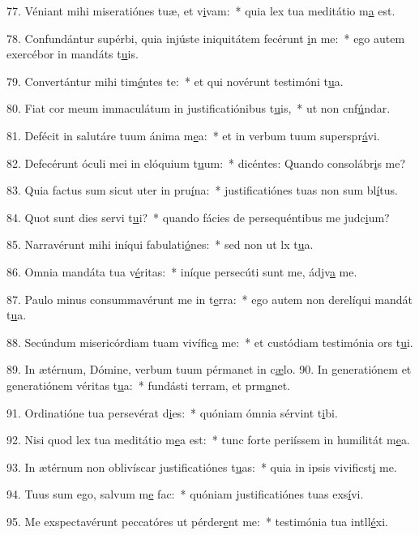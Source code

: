 77. Véniant mihi miseratiónes tuæ, et v\uline{i}vam:~* quia lex tua meditátio m\uline{a} est.\par 
78. Confundántur supérbi, quia injúste iniquitátem fecérunt \uline{i}n me:~* ego autem exercébor in mandáts t\uline{u}is.\par 
79. Convertántur mihi tim\uline{é}ntes te:~* et qui novérunt testimóni t\uline{u}a.\par 
80. Fiat cor meum immaculátum in justificatiónibus t\uline{u}is,~* ut non cnf\uline{ú}ndar.\par 
81. Defécit in salutáre tuum ánima m\uline{e}a:~* et in verbum tuum superspr\uline{á}vi.\par 
82. Defecérunt óculi mei in elóquium t\uline{u}um:~* dicéntes: Quando consolábr\uline{i}s me?\par 
83. Quia factus sum sicut uter in pru\uline{í}na:~* justificatiónes tuas non sum bl\uline{í}tus.\par 
84. Quot sunt dies servi t\uline{u}i?~* quando fácies de persequéntibus me judc\uline{i}um?\par 
85. Narravérunt mihi iníqui fabulati\uline{ó}nes:~* sed non ut lx t\uline{u}a.\par 
86. Omnia mandáta tua v\uline{é}ritas:~* iníque persecúti sunt me, ádjv\uline{a} me.\par 
87. Paulo minus consummavérunt me in t\uline{e}rra:~* ego autem non derelíqui mandát t\uline{u}a.\par 
88. Secúndum misericórdiam tuam vivífic\uline{a} me:~* et custódiam testimónia ors t\uline{u}i.\par 
89. In ætérnum, Dómine, verbum tuum pérmanet in c\uline{æ}lo.
90. In generatiónem et generatiónem véritas t\uline{u}a:~* fundásti terram, et prm\uline{a}net.\par 
91. Ordinatióne tua persevérat d\uline{i}es:~* quóniam ómnia sérvint t\uline{i}bi.\par 
92. Nisi quod lex tua meditátio m\uline{e}a est:~* tunc forte periíssem in humilitát m\uline{e}a.\par 
93. In ætérnum non oblivíscar justificatiónes t\uline{u}as:~* quia in ipsis vivificst\uline{i} me.\par 
94. Tuus sum ego, salvum m\uline{e} fac:~* quóniam justificatiónes tuas exs\uline{í}vi.\par 
95. Me exspectavérunt peccatóres ut pérder\uline{e}nt me:~* testimónia tua intll\uline{é}xi.\par 
